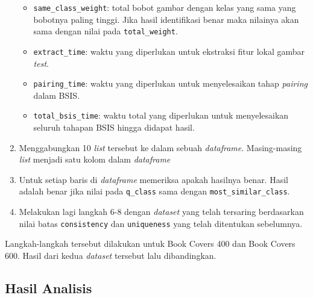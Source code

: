 \begin{enumerate}
\begin{itemize}
		\item \texttt{same\_class\_weight}: total bobot gambar dengan kelas yang sama yang bobotnya paling tinggi. Jika hasil identifikasi benar maka nilainya akan sama dengan nilai pada \texttt{total\_weight}.
		\item \texttt{extract\_time}: waktu yang diperlukan untuk ekstraksi fitur lokal gambar \textit{test}.
		\item \texttt{pairing\_time}: waktu yang diperlukan untuk menyelesaikan tahap \textit{pairing} dalam BSIS.
		\item \texttt{total\_bsis\_time}: waktu total yang diperlukan untuk menyelesaikan seluruh tahapan BSIS hingga didapat hasil.
	\end{itemize}
	\item Menggabungkan 10 \textit{list} tersebut ke dalam sebuah \textit{dataframe}. Masing-masing \textit{list} menjadi satu kolom dalam \textit{dataframe}
	\item Untuk setiap baris di \textit{dataframe} memeriksa apakah hasilnya benar. Hasil adalah benar jika nilai pada \texttt{q\_class} sama dengan \texttt{most\_similar\_class}. 
	\item Melakukan lagi langkah 6-8 dengan \textit{dataset} yang telah tersaring berdasarkan nilai batas \texttt{consistency} dan \texttt{uniqueness} yang telah ditentukan sebelumnya.
\end{enumerate}
Langkah-langkah tersebut dilakukan untuk Book Covers 400 dan Book Covers 600. Hasil dari kedua \textit{dataset} tersebut lalu dibandingkan.

\newpage
\subsection{Hasil Analisis}
